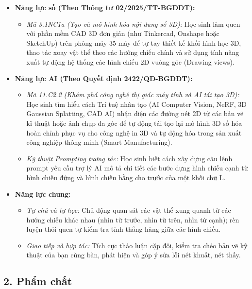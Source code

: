 \documentclass[12pt, a4paper]{article}
\begin{document}
\begin{itemize}[leftmargin=1.2cm]
    \item \textbf{Năng lực số (Theo Thông tư 02/2025/TT-BGDĐT):}
    \begin{itemize}[leftmargin=0.6cm]
        \item \textit{Mã 3.1NC1a (Tạo và mô hình hóa nội dung số 3D):} Học sinh làm quen với phần mềm CAD 3D đơn giản (như Tinkercad, Onshape hoặc SketchUp) trên phòng máy 35 máy để tự tay thiết kế khối hình học 3D, thao tác xoay vật thể theo các hướng chiếu chính và sử dụng tính năng xuất tự động hệ thống các hình chiếu 2D vuông góc (Drawing views).
    \end{itemize}

    \item \textbf{Năng lực AI (Theo Quyết định 2422/QĐ-BGDĐT):}
    \begin{itemize}[leftmargin=0.6cm]
        \item \textit{Mã 11.C2.2 (Khám phá công nghệ thị giác máy tính và AI tái tạo 3D):} Học sinh tìm hiểu cách Trí tuệ nhân tạo (AI Computer Vision, NeRF, 3D Gaussian Splatting, CAD AI) nhận diện các đường nét 2D từ các bản vẽ kĩ thuật hoặc ảnh chụp đa góc để tự động tái tạo lại mô hình 3D số hóa hoàn chỉnh phục vụ cho công nghệ in 3D và tự động hóa trong sản xuất công nghiệp thông minh (Smart Manufacturing).
        \item \textit{Kỹ thuật Prompting tương tác:} Học sinh biết cách xây dựng câu lệnh prompt yêu cầu trợ lý AI mô tả chi tiết các bước dựng hình chiếu cạnh từ hình chiếu đứng và hình chiếu bằng cho trước của một khối chữ L.
    \end{itemize}

    \item \textbf{Năng lực chung:}
    \begin{itemize}[leftmargin=0.6cm]
        \item \textit{Tự chủ và tự học:} Chủ động quan sát các vật thể xung quanh từ các hướng chiếu khác nhau (nhìn từ trước, nhìn từ trên, nhìn từ cạnh); rèn luyện thói quen tự kiểm tra tính thẳng hàng giữa các hình chiếu.
        \item \textit{Giao tiếp và hợp tác:} Tích cực thảo luận cặp đôi, kiểm tra chéo bản vẽ kỹ thuật của bạn cùng bàn, phát hiện và góp ý sửa lỗi nét khuất, nét thấy.
    \end{itemize}
\end{itemize}

\subsection*{2. Phẩm chất}
\end{document}
